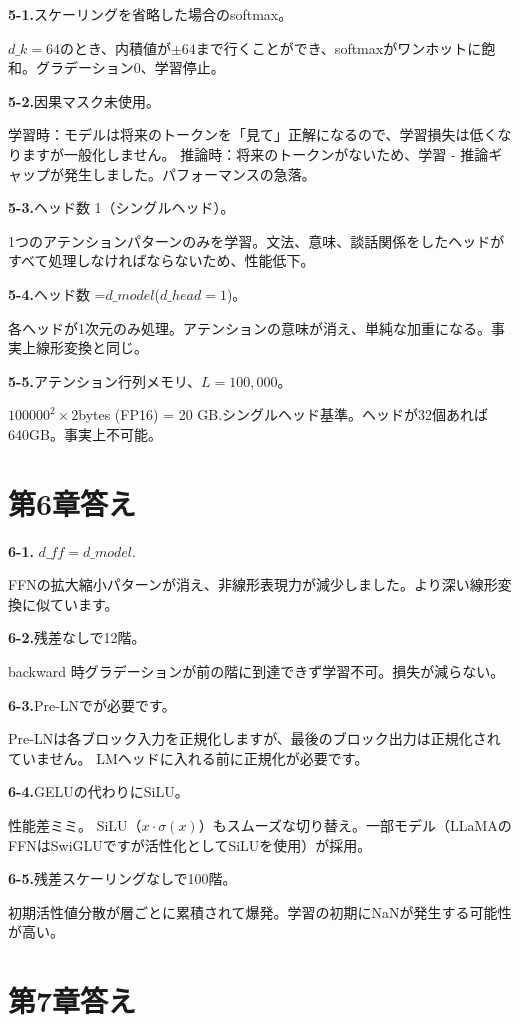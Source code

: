\textbf{5-1.}スケーリングを省略した場合のsoftmax。

$d\_k=64$のとき、内積値が$\pm 64$まで行くことができ、softmaxがワンホットに飽和。グラデーション0、学習停止。

\textbf{5-2.}因果マスク未使用。

学習時：モデルは将来のトークンを「見て」正解になるので、学習損失は低くなりますが一般化しません。
推論時：将来のトークンがないため、学習 - 推論ギャップが発生しました。パフォーマンスの急落。

\textbf{5-3.}ヘッド数 1（シングルヘッド）。

1つのアテンションパターンのみを学習。文法、意味、談話関係をしたヘッドがすべて処理しなければならないため、性能低下。

\textbf{5-4.}ヘッド数 =$d\_{model}$($d\_{head}=1$)。

各ヘッドが1次元のみ処理。アテンションの意味が消え、単純な加重になる。事実上線形変換と同じ。

\textbf{5-5.}アテンション行列メモリ、$L=100,000$。

$100000^2 \times 2$bytes (FP16) = 20 GB.シングルヘッド基準。ヘッドが32個あれば640GB。事実上不可能。

\section{第6章答え}

\textbf{6-1.} $d\_{ff} = d\_{model}$.

FFNの拡大縮小パターンが消え、非線形表現力が減少しました。より深い線形変換に似ています。

\textbf{6-2.}残差なしで12階。

backward 時グラデーションが前の階に到達できず学習不可。損失が減らない。

\textbf{6-3.}Pre-LNでが必要です。

Pre-LNは各ブロック入力を正規化しますが、最後のブロック出力は正規化されていません。 LMヘッドに入れる前に正規化が必要です。

\textbf{6-4.}GELUの代わりにSiLU。

性能差ミミ。 SiLU（$x \cdot \sigma(x)$）もスムーズな切り替え。一部モデル（LLaMAのFFNはSwiGLUですが活性化としてSiLUを使用）が採用。

\textbf{6-5.}残差スケーリングなしで100階。

初期活性値分散が層ごとに累積されて爆発。学習の初期にNaNが発生する可能性が高い。

\section{第7章答え}

